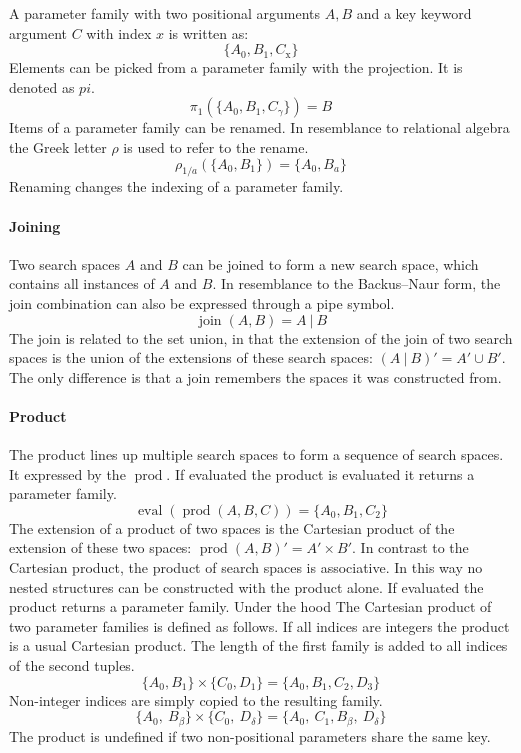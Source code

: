 \documentclass[english]{article}
\newcommand{\eval}{\operatorname{eval}}
\newcommand{\prot}{\operatorname{prod}}
\begin{document}
A parameter family with two positional arguments $A,B$ and a key keyword argument $C$ with index $x$ is written as:
$$\{A_0, B_1, C_{\text{x}}\}$$
Elements can be picked from a parameter family with the projection. It is denoted as $pi$.
$$\pi_1(\{A_0, B_1, C_\gamma\}) = B$$
Items of a parameter family can be renamed. In resemblance to relational algebra the Greek letter $\rho$ is used to refer to the rename.
$$\rho_{1/a}(\{A_{0}, B_{1}\}) = \{A_{0}, B_{a}\}$$
Renaming changes the indexing of a parameter family.

\paragraph{Joining}
Two search spaces $A$ and $B$ can be joined to form a new search space, which contains all instances of $A$ and $B$. In resemblance to the Backus–Naur form, the join combination can also be expressed through a pipe symbol.
$$ \operatorname{join}(A, B) = A\ |\ B $$
The join is related to the set union, in that the extension of the join of two search spaces is the union of the extensions of these search spaces: $(A\ |\ B)' = A' \cup B'$. The only difference is that a join remembers the spaces it was constructed from.

\paragraph{Product}
The product lines up multiple search spaces to form a sequence of search spaces. It expressed by the $\prot$. If evaluated the product is evaluated it returns a parameter family.
$$\eval(\prot(A, B, C)) = \{A_0, B_1, C_2\}$$
The extension of a product of two spaces is the Cartesian product of the extension of these two spaces: $\prot(A,B)' = A' \times B'$. In contrast to the Cartesian product, the product of search spaces is associative.  In this way no nested structures can be constructed with the product alone. If evaluated the product returns a parameter family. Under the hood
The Cartesian product of two parameter families is defined as follows. If all indices are integers the product is a usual Cartesian product. The length of the first family is added to all indices of the second tuples.
$$\{A_0, B_1\} \times \{C_0, D_1\} = \{A_0, B_1, C_2, D_3\}$$
Non-integer indices are simply copied to the resulting family.
$$\{A_0,\ B_\beta\} \times \{C_0,\ D_\delta\} = \{A_0,\ C_1, B_\beta,\ D_\delta\}$$
The product is undefined if two non-positional parameters share the same key.
\end{document}
